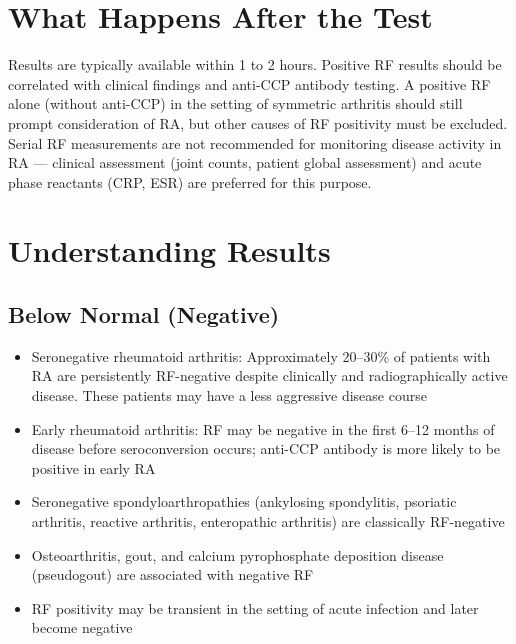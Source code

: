 \section*{What Happens After the Test}
Results are typically available within 1 to 2 hours. Positive RF results should be correlated with clinical findings and anti-CCP antibody testing. A positive RF alone (without anti-CCP) in the setting of symmetric arthritis should still prompt consideration of RA, but other causes of RF positivity must be excluded. Serial RF measurements are not recommended for monitoring disease activity in RA --- clinical assessment (joint counts, patient global assessment) and acute phase reactants (CRP, ESR) are preferred for this purpose.

\section*{Understanding Results}

\subsection*{Below Normal (Negative)}
\begin{itemize}
  \item Seronegative rheumatoid arthritis: Approximately 20--30\% of patients with RA are persistently RF-negative despite clinically and radiographically active disease. These patients may have a less aggressive disease course
  \item Early rheumatoid arthritis: RF may be negative in the first 6--12 months of disease before seroconversion occurs; anti-CCP antibody is more likely to be positive in early RA
  \item Seronegative spondyloarthropathies (ankylosing spondylitis, psoriatic arthritis, reactive arthritis, enteropathic arthritis) are classically RF-negative
  \item Osteoarthritis, gout, and calcium pyrophosphate deposition disease (pseudogout) are associated with negative RF
  \item RF positivity may be transient in the setting of acute infection and later become negative
\end{itemize}


